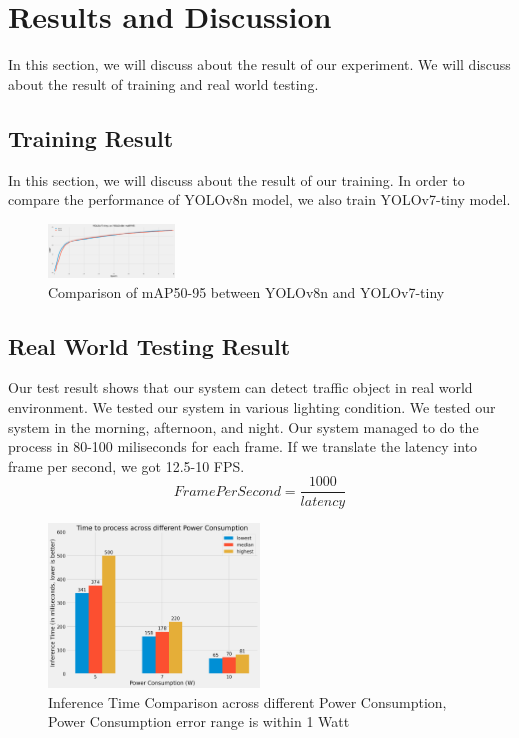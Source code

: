 \documentclass[conference]{IEEEtran}
\begin{document}
\section{Results and Discussion}
In this section, we will discuss about the result of our experiment. We will discuss about the result of training and real world testing.
\subsection{Training Result}
In this section, we will discuss about the result of our training. In order to compare the performance of YOLOv8n model, we also train YOLOv7-tiny model.

\begin{figure}[h!]
\centering
\includegraphics[width=0.3\textwidth,keepaspectratio]{YOLOv7-tinyvsYOLOv8n.png}
\caption{Comparison of mAP50-95 between YOLOv8n and YOLOv7-tiny}
\label{fig:mAP_comparison}
\end{figure}



\subsection{Real World Testing Result}
Our test result shows that our system can detect traffic object in real world environment. We tested our system in various lighting condition. We tested our system in the morning, afternoon, and night. Our system managed to do the process in 80-100 miliseconds for each frame. If we translate the latency into frame per second, we got 12.5-10 FPS. 
\begin{equation}
    Frame Per Second = \frac{1000}{latency}
\end{equation}

\begin{figure}[h!]
\centering
\includegraphics[width=0.5\textwidth,keepaspectratio]{inference_time_comparison.png}
\caption{Inference Time Comparison across different Power Consumption, Power Consumption error range is within 1 Watt}
\label{fig:inference_time_comparison}
\end{figure}
\end{document}
